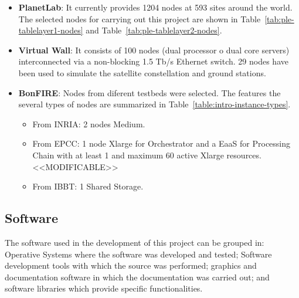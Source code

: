 \begin{itemize}
\item \textbf{PlanetLab}: It currently provides 1204 nodes at 593 sites around
  the world. The selected nodes for carrying out this project are shown in
  Table~\ref{tab:ple-tablelayer1-nodes} and Table~\ref{tab:ple-tablelayer2-nodes}.

\item \textbf{Virtual Wall}: It consists of 100 nodes (dual processor o dual
  core servers) interconnected via a non-blocking 1.5 Tb/s Ethernet switch. 29
  nodes have been used to simulate the satellite constellation and ground
  stations. 

\item \textbf{BonFIRE}: Nodes from diferent testbeds were selected. The
  features the several types of nodes are summarized in Table~\ref{table:intro-instance-types}.
  \begin{itemize}
    \item From INRIA: 2 nodes Medium.
    \item From EPCC: 1 node Xlarge for Orchestrator and a \ac{EaaS} for
      Processing Chain with at least 1  and maximum 60 active Xlarge resources. <<MODIFICABLE>>
    \item From IBBT: 1 Shared Storage.

    \end{itemize}
\end{itemize}


\subsection{Software}

The software  used in the development of this project can be grouped in:
Operative Systems where the software was developed and tested; Software
development tools with which the source was performed;  graphics and documentation
software in which the documentation was carried out; and software libraries
which provide specific functionalities.

